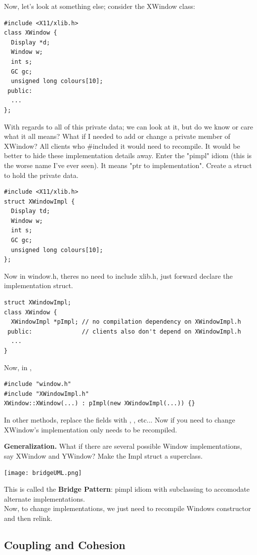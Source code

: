 \documentclass[english, 11pt]{article}
\begin{document}
Now, let's look at something else; consider the XWindow class:
\begin{lstlisting}
#include <X11/xlib.h>
class XWindow {
  Display *d;
  Window w;
  int s;
  GC gc;
  unsigned long colours[10];
 public:
  ...
};
\end{lstlisting}
With regards to all of this private data; we can look at it, but do we know or care what it all means? What if I needed to add or change a private member of XWindow? All clients who \#included it would need to recompile. It would be better to hide these implementation details away. Enter the "pimpl" idiom (this is the worse name I've ever seen). It means "ptr to implementation". Create a struct to hold the private data.

\begin{lstlisting}[title=xwindowimpl.h]
#include <X11/xlib.h>
struct XWindowImpl {
  Display td;
  Window w;
  int s;
  GC gc;
  unsigned long colours[10];
};
\end{lstlisting}
Now in window.h, theres no need to include xlib.h, just forward declare the implementation struct.
\begin{lstlisting}
struct XWindowImpl;
class XWindow {
  XWindowImpl *pImpl; // no compilation dependency on XWindowImpl.h
 public:              // clients also don't depend on XWindowImpl.h
  ...
}
\end{lstlisting}
Now, in ,
\begin{lstlisting}[title=window.h]
#include "window.h"
#include "XWindowImpl.h"
XWindow::XWindow(...) : pImpl(new XWindowImpl(...)) {}
\end{lstlisting}
In other methods, replace the fields  with , , etc... Now if you need to change XWindow's implementation only  needs to be recompiled.

\textbf{Generalization.} What if there are several possible Window implementations, say XWindow and YWindow? Make the Impl struct a superclass.

\begin{center}
  \texttt{[image: bridgeUML.png]}
\end{center}
This is called the \textbf{Bridge Pattern}: pimpl idiom with subclassing to accomodate alternate implementations. \\

Now, to change implementations, we just need to recompile Windows constructor and then relink.


\subsection{Coupling and Cohesion}
\end{document}
